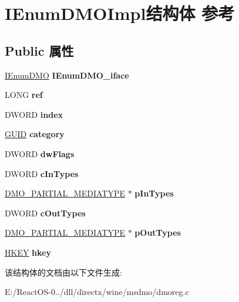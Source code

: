 \hypertarget{struct_i_enum_d_m_o_impl}{}\section{I\+Enum\+D\+M\+O\+Impl结构体 参考}
\label{struct_i_enum_d_m_o_impl}
\subsection*{Public 属性}
\begin{DoxyCompactItemize}
\item 
\mbox{\label{struct_i_enum_d_m_o_impl_ad2ad4ca6b6f1700eb550a006d70d4bd9}} 
\hyperlink{interface_i_enum_d_m_o}{I\+Enum\+D\+MO} {\bfseries I\+Enum\+D\+M\+O\+\_\+iface}
\item 
\mbox{\label{struct_i_enum_d_m_o_impl_ae9673dcf6bd4ada48462fe2868ea904c}} 
L\+O\+NG {\bfseries ref}
\item 
\mbox{\label{struct_i_enum_d_m_o_impl_a2c1e19a1f71cd50811e9589e42c3252f}} 
D\+W\+O\+RD {\bfseries index}
\item 
\mbox{\label{struct_i_enum_d_m_o_impl_a3da95941b13a10e9aa98c8b397f4688a}} 
\hyperlink{interface_g_u_i_d}{G\+U\+ID} {\bfseries category}
\item 
\mbox{\label{struct_i_enum_d_m_o_impl_a36bac40204aa5efd90064a97e80d4803}} 
D\+W\+O\+RD {\bfseries dw\+Flags}
\item 
\mbox{\label{struct_i_enum_d_m_o_impl_afe95496011340b27713641c99a92daeb}} 
D\+W\+O\+RD {\bfseries c\+In\+Types}
\item 
\mbox{\label{struct_i_enum_d_m_o_impl_af979d2b34607fdb8217a061411abe826}} 
\hyperlink{struct___d_m_o___p_a_r_t_i_a_l___m_e_d_i_a_t_y_p_e}{D\+M\+O\+\_\+\+P\+A\+R\+T\+I\+A\+L\+\_\+\+M\+E\+D\+I\+A\+T\+Y\+PE} $\ast$ {\bfseries p\+In\+Types}
\item 
\mbox{\label{struct_i_enum_d_m_o_impl_a7ac540bfa3fc90fecc2bb36502fb3b70}} 
D\+W\+O\+RD {\bfseries c\+Out\+Types}
\item 
\mbox{\label{struct_i_enum_d_m_o_impl_a37b59145a0a6e82eb2dbf722246f9f96}} 
\hyperlink{struct___d_m_o___p_a_r_t_i_a_l___m_e_d_i_a_t_y_p_e}{D\+M\+O\+\_\+\+P\+A\+R\+T\+I\+A\+L\+\_\+\+M\+E\+D\+I\+A\+T\+Y\+PE} $\ast$ {\bfseries p\+Out\+Types}
\item 
\mbox{\label{struct_i_enum_d_m_o_impl_a170fb02045ccf60e901dc986ea7b1f03}} 
\hyperlink{interfacevoid}{H\+K\+EY} {\bfseries hkey}
\end{DoxyCompactItemize}


该结构体的文档由以下文件生成\+:\begin{DoxyCompactItemize}
\item 
E\+:/\+React\+O\+S-\/0../dll/directx/wine/msdmo/dmoreg.\+c\end{DoxyCompactItemize}
